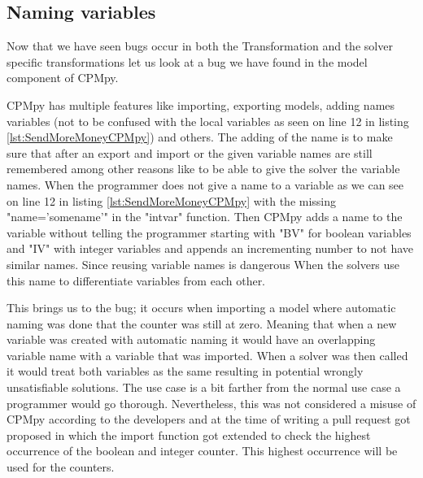 %
%

\subsection{Naming variables}
\label{res:bug:Naming+andImport}
Now that we have seen bugs occur in both the Transformation and the solver specific transformations let us look at a bug we have found in the model component of CPMpy. 

CPMpy has multiple features like importing, exporting models, adding names variables (not to be confused with the local variables as seen on line 12 in listing \ref{lst:SendMoreMoneyCPMpy}) and others. The adding of the name is to make sure that after an export and import or the given variable names are still remembered among other reasons like to be able to give the solver the variable names. When the programmer does not give a name to a variable as we can see on line 12 in listing \ref{lst:SendMoreMoneyCPMpy} with the missing "name='somename'" in the "intvar" function. Then CPMpy adds a name to the variable without telling the programmer starting with "BV" for boolean variables and "IV" with integer variables and appends an incrementing number to not have similar names. Since reusing variable names is dangerous When the solvers use this name to differentiate variables from each other.

This brings us to the bug; it occurs when importing a model where automatic naming was done that the counter was still at zero. Meaning that when a new variable was created with automatic naming it would have an overlapping variable name with a variable that was imported. When a solver was then called it would treat both variables as the same resulting in potential wrongly unsatisfiable solutions. The use case is a bit farther from the normal use case a programmer would go thorough. Nevertheless, this was not considered a misuse of CPMpy according to the developers and at the time of writing a pull request got proposed in which the import function got extended to check the highest occurrence of the boolean and integer counter. This highest occurrence will be used for the counters.

